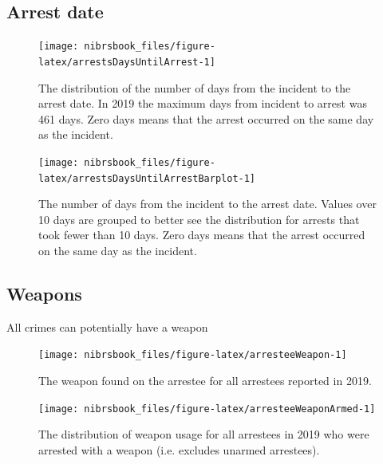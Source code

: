 \documentclass[
  12pt,
  openany]{book}
\begin{document}
\hypertarget{arrest-date}{%
\subsection{Arrest date}\label{arrest-date}}

\begin{figure}

{\centering \texttt{[image: nibrsbook\_files/figure-latex/arrestsDaysUntilArrest-1]} 

}

\caption{The distribution of the number of days from the incident to the arrest date. In 2019 the maximum days from incident to arrest was 461 days. Zero days means that the arrest occurred on the same day as the incident.}\label{fig:arrestsDaysUntilArrest}
\end{figure}

\begin{figure}

{\centering \texttt{[image: nibrsbook\_files/figure-latex/arrestsDaysUntilArrestBarplot-1]} 

}

\caption{The number of days from the incident to the arrest date. Values over 10 days are grouped to better see the distribution for arrests that took fewer than 10 days. Zero days means that the arrest occurred on the same day as the incident.}\label{fig:arrestsDaysUntilArrestBarplot}
\end{figure}

\hypertarget{weapons-1}{%
\subsection{Weapons}\label{weapons-1}}

All crimes can potentially have a weapon

\begin{figure}

{\centering \texttt{[image: nibrsbook\_files/figure-latex/arresteeWeapon-1]} 

}

\caption{The weapon found on the arrestee for all arrestees reported in 2019.}\label{fig:arresteeWeapon}
\end{figure}

\begin{figure}

{\centering \texttt{[image: nibrsbook\_files/figure-latex/arresteeWeaponArmed-1]} 

}

\caption{The distribution of weapon usage for all arrestees in 2019 who were arrested with a weapon (i.e. excludes unarmed arrestees).}\label{fig:arresteeWeaponArmed}
\end{figure}
\end{document}
